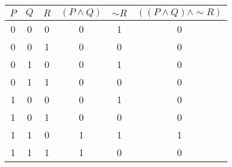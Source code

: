 \begin{tabular}{|c|c|c||c|c|c|}
\hline
$ P $ & $ Q $ & $ R $ & $ (P \wedge Q) $ & $  \sim R $ & $ ((P \wedge Q) \wedge  \sim R) $ \\
\hline
0 & 0 & 0 & 0 & 1 & 0 \\
0 & 0 & 1 & 0 & 0 & 0 \\
0 & 1 & 0 & 0 & 1 & 0 \\
0 & 1 & 1 & 0 & 0 & 0 \\
1 & 0 & 0 & 0 & 1 & 0 \\
1 & 0 & 1 & 0 & 0 & 0 \\
1 & 1 & 0 & 1 & 1 & 1 \\
1 & 1 & 1 & 1 & 0 & 0 \\
\hline
\end{tabular}
